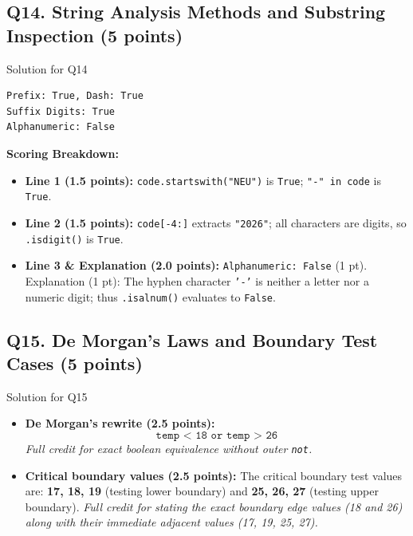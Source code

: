 \documentclass[11pt,a4paper]{article}
\begin{document}
\subsection*{Q14. String Analysis Methods and Substring Inspection (5 points)}
\begin{solbox}{Solution for Q14}
\begin{lstlisting}
Prefix: True, Dash: True
Suffix Digits: True
Alphanumeric: False
\end{lstlisting}
\textbf{Scoring Breakdown:}
\begin{itemize}[leftmargin=2em]
  \item \textbf{Line 1 (1.5 points):} \texttt{code.startswith("NEU")} is \texttt{True}; \texttt{"-" in code} is \texttt{True}.
  \item \textbf{Line 2 (1.5 points):} \texttt{code[-4:]} extracts \texttt{"2026"}; all characters are digits, so \texttt{.isdigit()} is \texttt{True}.
  \item \textbf{Line 3 \& Explanation (2.0 points):} \texttt{Alphanumeric: False} (1 pt). Explanation (1 pt): The hyphen character \texttt{'-'} is neither a letter nor a numeric digit; thus \texttt{.isalnum()} evaluates to \texttt{False}.
\end{itemize}
\end{solbox}

\subsection*{Q15. De Morgan's Laws and Boundary Test Cases (5 points)}
\begin{solbox}{Solution for Q15}
\begin{itemize}[leftmargin=2em]
  \item \textbf{De Morgan's rewrite (2.5 points):}
  $$\texttt{temp < 18 or temp > 26}$$
  \textit{Full credit for exact boolean equivalence without outer \texttt{not}.}
  \item \textbf{Critical boundary values (2.5 points):}
  The critical boundary test values are: \textbf{17, 18, 19} (testing lower boundary) and \textbf{25, 26, 27} (testing upper boundary).
  \textit{Full credit for stating the exact boundary edge values (18 and 26) along with their immediate adjacent values (17, 19, 25, 27).}
\end{itemize}
\end{solbox}

\newpage

\end{document}
